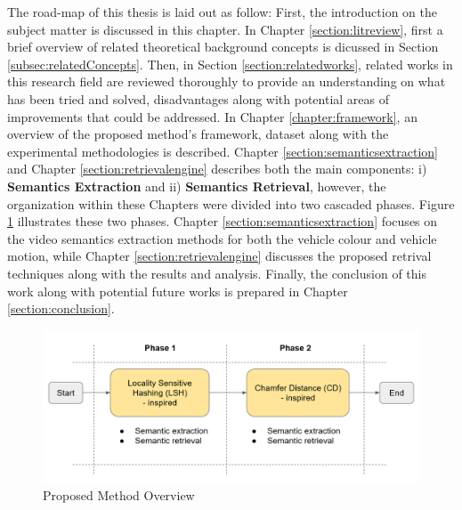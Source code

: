 The road-map of this thesis is laid out as follow: First, the introduction on the subject matter is discussed in this chapter.
In Chapter \ref{section:litreview}, first a brief overview of related theoretical background concepts is dicussed in Section \ref{subsec:relatedConcepts}. Then, in Section \ref{section:relatedworks}, related works in this research field are reviewed thoroughly to provide an understanding on what has been tried and solved, disadvantages along with potential areas of improvements that could be addressed.
In Chapter \ref{chapter:framework}, an overview of the proposed method's framework, dataset along with the experimental methodologies is described.
Chapter \ref{section:semanticsextraction} and Chapter \ref{section:retrievalengine} describes both the main components: i) \textbf{Semantics Extraction} and ii) \textbf{Semantics Retrieval}, however, the organization within these Chapters were divided into two cascaded phases.
Figure \ref{fig:proposedmethodoverview} illustrates these two phases.
Chapter \ref{section:semanticsextraction} focuses on the video semantics extraction methods for both the vehicle colour and vehicle motion, while Chapter \ref{section:retrievalengine} discusses the proposed retrival techniques along with the results and analysis.
Finally, the conclusion of this work along with potential future works is prepared in Chapter \ref{section:conclusion}.



\begin{figure}[!hbt]\centering
\includegraphics[width=\textwidth]{image/general/phases.PNG}
\caption{Proposed Method Overview}
\label{fig:proposedmethodoverview}
\end{figure}
